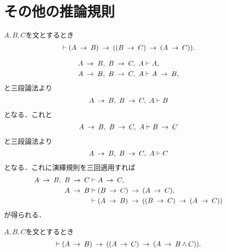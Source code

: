 \section{その他の推論規則}
	\begin{screen}
		\begin{logicalthm}[含意の推移律]
		\label{logicalthm:transitive_law_of_implication}
			$A,B,C$を文とするとき
			\begin{align}
				\vdash (A \rarrow B) \rarrow ((B \rarrow C) \rarrow (A \rarrow C)).
			\end{align}
		\end{logicalthm}
	\end{screen}
	
	\begin{prf}
		\begin{align}
			A \rarrow B,\ B \rarrow C,\ A &\vdash A, \\
			A \rarrow B,\ B \rarrow C,\ A &\vdash A \rarrow B, \\
		\end{align}
		と三段論法より
		\begin{align}
			A \rarrow B,\ B \rarrow C,\ A \vdash B
		\end{align}
		となる．これと
		\begin{align}
			A \rarrow B,\ B \rarrow C,\ A \vdash B \rarrow C
		\end{align}
		と三段論法より
		\begin{align}
			A \rarrow B,\ B \rarrow C,\ A \vdash C
		\end{align}
		となる．これに演繹規則を三回適用すれば
		\begin{align}
			A \rarrow B,\ B \rarrow C &\vdash A \rarrow C, \\
			A \rarrow B &\vdash (B \rarrow C) \rarrow (A \rarrow C), \\
			&\vdash (A \rarrow B) \rarrow ((B \rarrow C) \rarrow (A \rarrow C))
		\end{align}
		が得られる．
		\QED
	\end{prf}
	
	\begin{screen}
		\begin{logicalthm}[二式が同時に導かれるならその論理積が導かれる]
		\label{logicalthm:conjunction_of_consequences}
			$A,B,C$を文とするとき
			\begin{align}
				\vdash (A \rarrow B) \rarrow ((A \rarrow C) 
				\rarrow (A \rarrow B \wedge C)).
			\end{align}
		\end{logicalthm}
	\end{screen}
	
